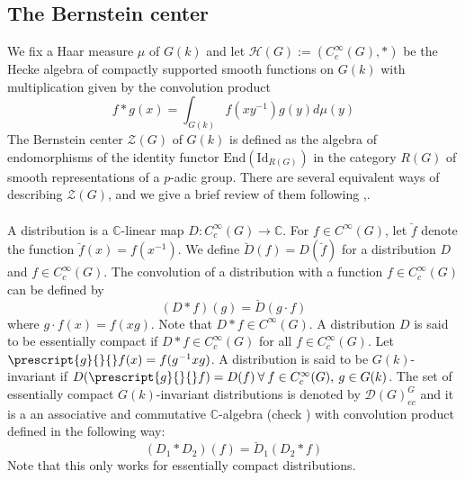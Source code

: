 \documentclass[11 pt]{article}
\numberwithin{equation}{subsection}
\theoremstyle{definition}
\theoremstyle{remark}
\theoremstyle{conjecture}
\newcommand{\Id}{\mathrm{Id}}
\newcommand{\C}{\mathbb C}
\newcommand{\HH}{\mathcal H}
\newcommand{\ZZ}{\mathcal{Z}}
\newcommand{\mc}{\mathcal}
\begin{document}
 \subsection{The Bernstein center}\label{section: Bernstein center}
We fix a Haar measure $\mu$ of $G(k)$ and let $\HH(G):=(C_c^\infty(G),*)$ be the Hecke algebra of compactly supported smooth functions on $G(k)$ with multiplication given by the convolution product 
\begin{equation}\label{eqn:convolutionwrtmu}
    f*g(x)= \int_{G(k)}f(xy^{-1})g(y)d\mu(y)
\end{equation}
The Bernstein center $\ZZ(G)$ of $G(k)$ is defined as the algebra of endomorphisms of the identity functor $\mathrm{End}(\Id_{R(G)})$ in the category $R(G)$ of smooth representations of a $p$-adic group. There are several equivalent ways of describing $\ZZ(G)$, and we give a brief review of them following \cite{BKV},\cite{haines}. \paragraph{}
A distribution is a $\C$-linear map $D:C_c^\infty(G)\rightarrow \C$. For $f \in C^\infty(G)$, let $\breve f$ denote the function $\breve f(x)=f(x^{-1})$. We define $\breve D(f)= D(\breve f )$ for a distribution $D$ and $f \in C^\infty_c(G)$. The convolution of a distribution with a function $f \in C^\infty_c(G)$ can be defined by 
\begin{equation*}
    (D*f)(g)=\breve D(g\cdot f)
\end{equation*}
where $g\cdot f(x)=f(xg)$. Note that $D*f \in C^\infty(G)$. A distribution $D$ is said to be essentially compact if $D*f \in C^\infty_c(G)$ for all $f \in C^\infty_c(G)$. Let $\prescript{g}{}{}f(x)= f(g^{-1}xg)$. A distribution is said to be $G(k)$-invariant if $D(\prescript{g}{}{}f)=D(f) \: \forall \: f \in C^\infty_c(G),\: g \in G(k)$. The set of essentially compact $G(k)$-invariant distributions is denoted by $\mc D(G)^G_{ec}$ and it is a an associative and commutative $\C$-algebra (check \cite[Corollary 3.1.2]{haines}) with convolution product defined in the following way:
\begin{equation*}
    (D_1*D_2)(f)=\breve D_1(D_2*f)
\end{equation*}
Note that this only works for essentially compact distributions. \paragraph{}
\end{document}
